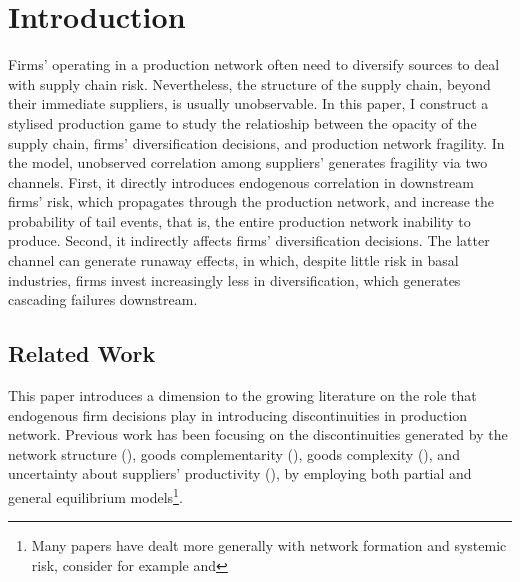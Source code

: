 \documentclass[../../main.tex]{subfiles}
\begin{document}
\section{Introduction}

\iffalse
\notes{
  \begin{enumerate}
    \item Research question
    \item Contribution to the literature
    \item Why do we care?
  \end{enumerate}
}
\fi

Firms' operating in a production network often need to diversify sources to deal with supply chain risk. Nevertheless, the structure of the supply chain, beyond their immediate suppliers, is usually unobservable. In this paper, I construct a stylised production game to study the relatioship between the opacity of the supply chain, firms' diversification decisions, and production network fragility. In the model, unobserved correlation among suppliers' generates fragility via two channels. First, it directly introduces endogenous correlation in downstream firms' risk, which propagates through the production network, and increase the probability of tail events, that is, the entire production network inability to produce. Second, it indirectly affects firms' diversification decisions. The latter channel can generate runaway effects, in which, despite little risk in basal industries, firms invest increasingly less in diversification, which generates cascading failures downstream.

\subsection{Related Work}

This paper introduces a dimension to the growing literature on the role that endogenous firm decisions play in introducing discontinuities in production network. Previous work has been focusing on the discontinuities generated by the network structure (\cite{baqaee_macroeconomic_2019}), goods complementarity (\cite{acemoglu_endogenous_2020}), goods complexity (\cite{elliott_supply_2022}), and uncertainty about suppliers' productivity (\cite{kopytov_endogenous_2021}), by employing both partial and general equilibrium models\footnote{Many papers have dealt more generally with network formation and systemic risk, consider for example  and }.
\end{document}

